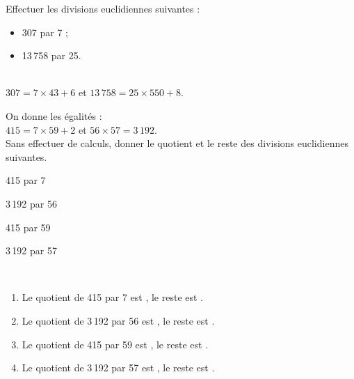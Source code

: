 \exercicesbase

\begin{colonne*exercice}

\begin{exercice} %
   Effectuer les divisions euclidiennes suivantes :
   \begin{itemize}
      \item 307 par 7 ;
      \item 13\,758 par 25.
   \end{itemize}
\end{exercice}
        
\begin{corrige}
   {\small {} \hfill {}} \\
   {\blue $307 =7\times43+6$} \hfill et \hfill {\blue $13\,758 =25\times550+8$}.
\end{corrige}

\bigskip


\begin{exercice} %
   On donne les égalités : \\
   $415 = 7\times59+2$ \; et \; $56\times57 = 3\,192$. \\
   Sans effectuer de calculs, donner le quotient et le reste des divisions euclidiennes suivantes.
   \begin{colenumerate}{2}
      \item 415 par 7
      \item 3\,192 par 56
      \item 415 par 59
      \item 3\,192 par 57
   \end{colenumerate}
\end{exercice}

\begin{corrige}
   \ \\ [-5mm]
   \begin{enumerate}
      \item Le quotient de 415 par 7 est {}, le reste est {}.
      \item Le quotient de 3\,192 par 56 est {}, le reste est {}.
      \item Le quotient de 415 par 59 est {}, le reste est {}.
      \item Le quotient de 3\,192 par 57 est {}, le reste est {}.
   \end{enumerate}
\end{corrige}


\end{colonne*exercice}
